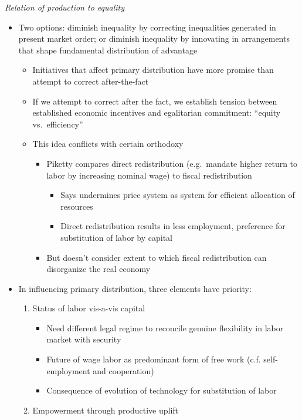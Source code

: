 \emph{Relation of production to equality}

\begin{itemize}
\tightlist
\item
  Two options: diminish inequality by correcting inequalities generated
  in present market order; or diminish inequality by innovating in
  arrangements that shape fundamental distribution of advantage

  \begin{itemize}
  \tightlist
  \item
    Initiatives that affect primary distribution have more promise than
    attempt to correct after-the-fact
  \item
    If we attempt to correct after the fact, we establish tension
    between established economic incentives and egalitarian commitment:
    ``equity vs.~efficiency''
  \item
    This idea conflicts with certain orthodoxy

    \begin{itemize}
    \tightlist
    \item
      Piketty compares direct redistribution (e.g.~mandate higher return
      to labor by increasing nominal wage) to fiscal redistribution

      \begin{itemize}
      \tightlist
      \item
        Says undermines price system as system for efficient allocation
        of resources
      \item
        Direct redistribution results in less employment, preference for
        substitution of labor by capital
      \end{itemize}
    \item
      But doesn't consider extent to which fiscal redistribution can
      disorganize the real economy
    \end{itemize}
  \end{itemize}
\item
  In influencing primary distribution, three elements have priority:

  \begin{enumerate}
  \def\labelenumi{\arabic{enumi}.}
  \tightlist
  \item
    Status of labor vis-a-vis capital

    \begin{itemize}
    \tightlist
    \item
      Need different legal regime to reconcile genuine flexibility in
      labor market with security
    \item
      Future of wage labor as predominant form of free work (c.f.
      self-employment and cooperation)
    \item
      Consequence of evolution of technology for substitution of labor
    \end{itemize}
  \item
    Empowerment through productive uplift


\end{enumerate}
\end{itemize}
